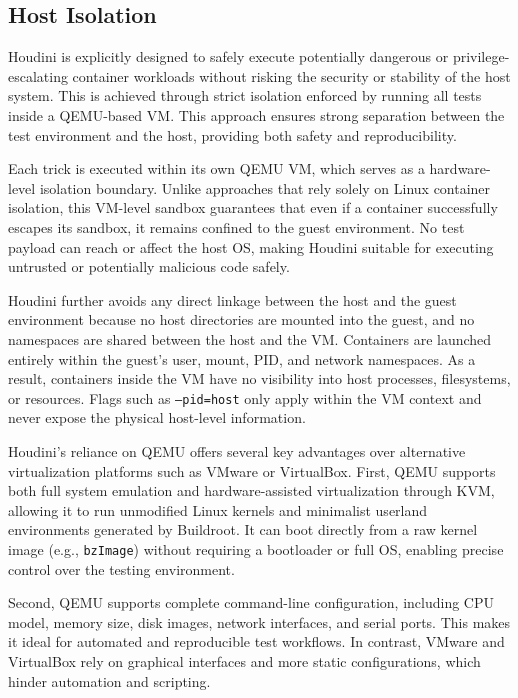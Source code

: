 \documentclass[12pt]{report}
\begin{document}
\begin{doublespace}
\section{Host Isolation}

Houdini is explicitly designed to safely execute potentially dangerous or privilege-escalating container workloads without risking the security or stability of the host system. This is achieved through strict isolation enforced by running all tests inside a QEMU-based VM. This approach ensures strong separation between the test environment and the host, providing both safety and reproducibility.

Each trick is executed within its own QEMU VM, which serves as a hardware-level isolation boundary. Unlike approaches that rely solely on Linux container isolation, this VM-level sandbox guarantees that even if a container successfully escapes its sandbox, it remains confined to the guest environment. No test payload can reach or affect the host OS, making Houdini suitable for executing untrusted or potentially malicious code safely.

Houdini further avoids any direct linkage between the host and the guest environment because no host directories are mounted into the guest, and no namespaces are shared between the host and the VM. Containers are launched entirely within the guest's user, mount, PID, and network namespaces. As a result, containers inside the VM have no visibility into host processes, filesystems, or resources. Flags such as \texttt{--pid=host} only apply within the VM context and never expose the physical host-level information.

Houdini's reliance on QEMU offers several key advantages over alternative virtualization platforms such as VMware or VirtualBox. First, QEMU supports both full system emulation and hardware-assisted virtualization through KVM, allowing it to run unmodified Linux kernels and minimalist userland environments generated by Buildroot. It can boot directly from a raw kernel image (e.g., \texttt{bzImage}) without requiring a bootloader or full OS, enabling precise control over the testing environment.

Second, QEMU supports complete command-line configuration, including CPU model, memory size, disk images, network interfaces, and serial ports. This makes it ideal for automated and reproducible test workflows. In contrast, VMware and VirtualBox rely on graphical interfaces and more static configurations, which hinder automation and scripting.


\end{doublespace}
\end{document}

